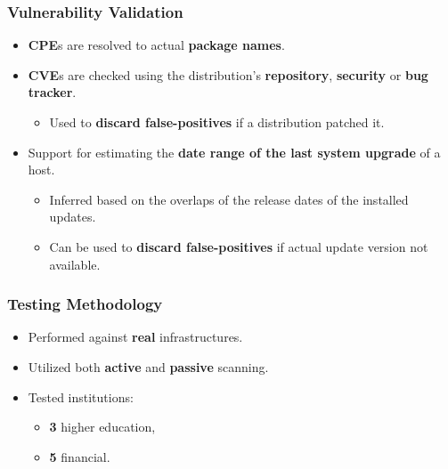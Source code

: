 \documentclass[aspectratio=169,xcolor={usenames,dvipsnames}]{beamer}
\newcommand{\ispace}{\vspace{10pt}}
\begin{document}
\begin{frame}
	\frametitle{Vulnerability Validation}
	
	\begin{itemize}
		\item \textbf{CPE}s are resolved to actual \textbf{package names}.
		\item \textbf{CVE}s are checked using the distribution's \textbf{repository}, \textbf{security} or \textbf{bug tracker}.
		\begin{itemize}
			\item Used to \textbf{discard false-positives} if a distribution patched it.
		\end{itemize}
	\end{itemize}
	
	\ispace
	
	\begin{itemize}
		\item Support for estimating the \textbf{date range of the last system upgrade} of a host.
		\begin{itemize}
			\item Inferred based on the overlaps of the release dates of the installed updates.
			\item Can be used to \textbf{discard false-positives} if actual update version not available.
		\end{itemize}
	\end{itemize}
\end{frame}

\begin{frame}
	\frametitle{Testing Methodology}
	
	\begin{itemize}
		\item Performed against \textbf{real} infrastructures.
		\item Utilized both \textbf{active} and \textbf{passive} scanning.
		\item Tested institutions:
		\begin{itemize}
			\item \textbf{3} higher education,
			\item \textbf{5} financial.
		\end{itemize}
	\end{itemize}
\end{frame}
\end{document}
